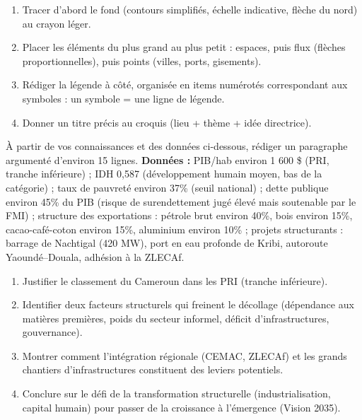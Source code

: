 \documentclass[11pt]{article}
\begin{document}
\begin{methode}
\begin{enumerate}
\item Tracer d'abord le fond (contours simplifiés, échelle indicative, flèche du nord) au crayon léger.
\item Placer les éléments du plus grand au plus petit : espaces, puis flux (flèches proportionnelles), puis points (villes, ports, gisements).
\item Rédiger la légende à côté, organisée en items numérotés correspondant aux symboles : un symbole = une ligne de légende.
\item Donner un titre précis au croquis (lieu + thème + idée directrice).
\end{enumerate}
\end{methode}

\begin{exercice}
À partir de vos connaissances et des données ci-dessous, rédiger un paragraphe argumenté d'environ 15 lignes.
\textbf{Données :} PIB/hab environ 1 600 \$ (PRI, tranche inférieure) ; IDH 0,587 (développement humain moyen, bas de la catégorie) ; taux de pauvreté environ 37\% (seuil national) ; dette publique environ 45\% du PIB (risque de surendettement jugé élevé mais soutenable par le FMI) ; structure des exportations : pétrole brut environ 40\%, bois environ 15\%, cacao-café-coton environ 15\%, aluminium environ 10\% ; projets structurants : barrage de Nachtigal (420 MW), port en eau profonde de Kribi, autoroute Yaoundé--Douala, adhésion à la ZLECAf.
\begin{enumerate}
\item Justifier le classement du Cameroun dans les PRI (tranche inférieure).
\item Identifier deux facteurs structurels qui freinent le décollage (dépendance aux matières premières, poids du secteur informel, déficit d'infrastructures, gouvernance).
\item Montrer comment l'intégration régionale (CEMAC, ZLECAf) et les grands chantiers d'infrastructures constituent des leviers potentiels.
\item Conclure sur le défi de la transformation structurelle (industrialisation, capital humain) pour passer de la croissance à l'émergence (Vision 2035).
\end{enumerate}
\end{exercice}
\end{document}
